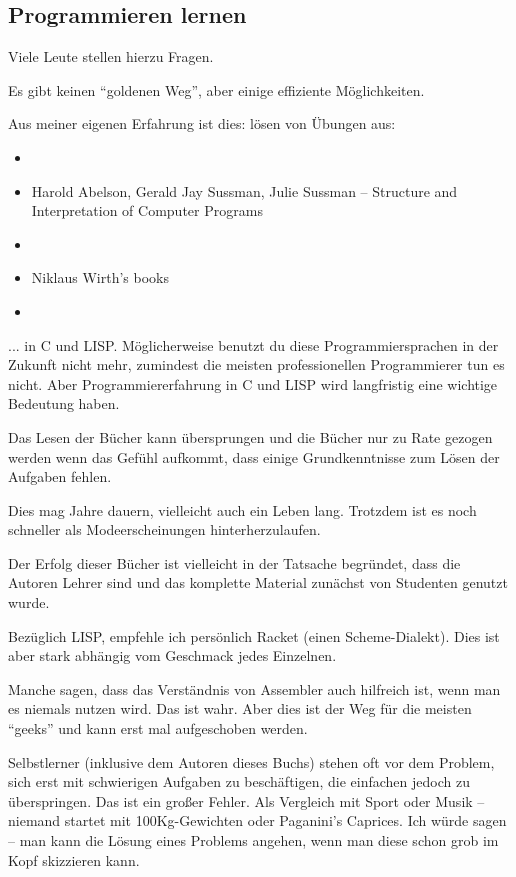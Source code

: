 



\subsection*{Programmieren lernen}

Viele Leute stellen hierzu Fragen.

Es gibt keinen ``goldenen Weg'', aber einige effiziente Möglichkeiten.

Aus meiner eigenen Erfahrung ist dies: lösen von Übungen aus:

\begin{itemize}
	\item \KRBook
	\item Harold Abelson, Gerald Jay Sussman, Julie Sussman -- Structure and Interpretation of Computer Programs
	\item \TAOCP
	\item Niklaus Wirth's books
	\item \RobPikePractice
\end{itemize}

... in C und LISP.
Möglicherweise benutzt du diese Programmiersprachen in der Zukunft nicht mehr, zumindest die meisten professionellen Programmierer tun es nicht. Aber Programmiererfahrung in C und LISP wird langfristig eine wichtige Bedeutung haben.

Das Lesen der Bücher kann übersprungen und die Bücher nur zu Rate gezogen werden wenn das Gefühl aufkommt, dass einige Grundkenntnisse zum Lösen der Aufgaben fehlen.

Dies mag Jahre dauern, vielleicht auch ein Leben lang. Trotzdem ist es noch schneller als Modeerscheinungen hinterherzulaufen.

Der Erfolg dieser Bücher ist vielleicht in der Tatsache begründet, dass die Autoren Lehrer sind und das komplette Material zunächst von Studenten genutzt wurde.

Bezüglich LISP, empfehle ich persönlich Racket (einen Scheme-Dialekt). Dies ist aber stark abhängig vom Geschmack jedes Einzelnen.

Manche sagen, dass das Verständnis von Assembler auch hilfreich ist, wenn man es niemals nutzen wird.
Das ist wahr.
Aber dies ist der Weg für die meisten ``geeks'' und kann erst mal aufgeschoben werden.

Selbstlerner (inklusive dem Autoren dieses Buchs) stehen oft vor dem Problem, sich erst mit schwierigen Aufgaben zu beschäftigen, die einfachen jedoch zu überspringen.
Das ist ein großer Fehler.
Als Vergleich mit Sport oder Musik -- niemand startet mit 100Kg-Gewichten oder Paganini's Caprices.
Ich würde sagen -- man kann die Lösung eines Problems angehen, wenn man diese schon grob im Kopf skizzieren kann.

